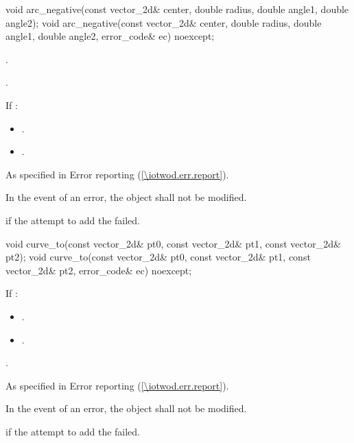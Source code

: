 \begin{itemdecl}
    void arc_negative(const vector_2d& center, double radius, double angle1,
      double angle2);
    void arc_negative(const vector_2d& center, double radius, double angle1,
      double angle2, error_code& ec) noexcept;
\end{itemdecl}
\begin{itemdescr}
	\pnum
	\effects
	.
	
	\pnum
	.
	
	\pnum
	If :
	\begin{itemize}
	\item {}.
	
	\item {}.
	\end{itemize}
	
	\pnum
	\throws
	As specified in Error reporting (\ref{\iotwod.err.report}).

	\pnum
	\remarks
	In the event of an error, the object shall not be modified.

	\pnum
	\errors
	 if the attempt to add the  failed.
\end{itemdescr}

\begin{itemdecl}
    void curve_to(const vector_2d& pt0, const vector_2d& pt1,
      const vector_2d& pt2);
    void curve_to(const vector_2d& pt0, const vector_2d& pt1,
      const vector_2d& pt2, error_code& ec) noexcept;
\end{itemdecl}
\begin{itemdescr}
	\pnum
	\effects
	If :
	\begin{itemize}
	\item {}.
	
	\item {}.
	\end{itemize}
	
	\pnum
	.
	
	\pnum
	\throws
	As specified in Error reporting (\ref{\iotwod.err.report}).

	\pnum
	\remarks
	In the event of an error, the object shall not be modified.

	\pnum
	\errors
	 if the attempt to add the  failed.
\end{itemdescr}


